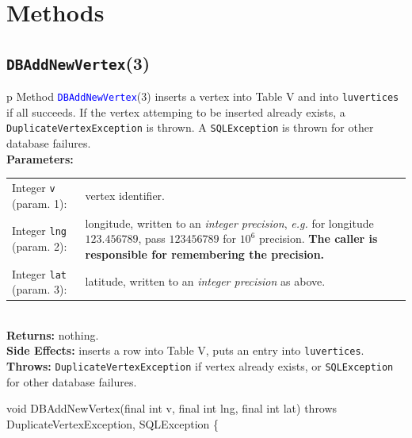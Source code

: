 \section{Methods}

\subsection{\texttt{DBAddNewVertex}(3)}
\begin{tabular}{p{\textwidth}}
\toprule
{}
Method \textcolor{blue}{{\tt{}\protect{}DBAddNewVertex}}(3) inserts a vertex into
Table V and into {\tt{}lu{}vertices} if all succeeds. If the vertex attemping
to be inserted already exists, a {\tt{}DuplicateVertexException} is thrown.
A {\tt{}SQLException} is thrown for other database failures.\\
\midrule
\textbf{Parameters:} \\
\begin{tabular}{lp{116mm}}
Integer {\tt{}v} (param. 1):&vertex identifier.\\
Integer {\tt{}lng} (param. 2):&longitude, written to an \emph{integer
precision}, \emph{e.g.} for longitude $123.456789$, pass $123456789$ for
$10^6$ precision. \textbf{The caller is responsible for remembering the
precision.}\\
Integer {\tt{}lat} (param. 3):&latitude, written to an \emph{integer
precision} as above.
\end{tabular}\\
\textbf{Returns:} nothing.\\
\textbf{Side Effects:} inserts a row into Table V, puts an entry into
{\tt{}lu{}vertices}.\\
\textbf{Throws:} {\tt{}DuplicateVertexException} if vertex already exists,
or {\tt{}SQLException} for other database failures.\\
\bottomrule
\end{tabular}
\nwenddocs{}\endmoddef{}
void DBAddNewVertex(final int v, final int lng, final int lat)
throws DuplicateVertexException, SQLException \{
\eatline
